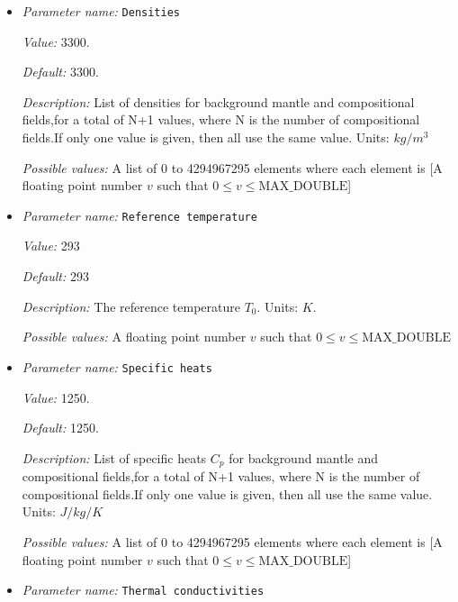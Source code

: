 \begin{itemize}
\item {\it Parameter name:} {\tt Densities}
\label{parameters:Material model/Dynamic Friction/Densities}
\label{parameters:Material_20model/Dynamic_20Friction/Densities}


{\it Value:} 3300.


{\it Default:} 3300.


{\it Description:} List of densities for background mantle and compositional fields,for a total of N+1 values, where N is the number of compositional fields.If only one value is given, then all use the same value.  Units: $kg / m^3$


{\it Possible values:} A list of 0 to 4294967295 elements where each element is [A floating point number $v$ such that $0 \leq v \leq \text{MAX\_DOUBLE}$]
\item {\it Parameter name:} {\tt Reference temperature}
\label{parameters:Material model/Dynamic Friction/Reference temperature}
\label{parameters:Material_20model/Dynamic_20Friction/Reference_20temperature}


{\it Value:} 293


{\it Default:} 293


{\it Description:} The reference temperature $T_0$. Units: $K$.


{\it Possible values:} A floating point number $v$ such that $0 \leq v \leq \text{MAX\_DOUBLE}$
\item {\it Parameter name:} {\tt Specific heats}
\label{parameters:Material model/Dynamic Friction/Specific heats}
\label{parameters:Material_20model/Dynamic_20Friction/Specific_20heats}


{\it Value:} 1250.


{\it Default:} 1250.


{\it Description:} List of specific heats $C_p$ for background mantle and compositional fields,for a total of N+1 values, where N is the number of compositional fields.If only one value is given, then all use the same value. Units: $J /kg /K$


{\it Possible values:} A list of 0 to 4294967295 elements where each element is [A floating point number $v$ such that $0 \leq v \leq \text{MAX\_DOUBLE}$]
\item {\it Parameter name:} {\tt Thermal conductivities}
\label{parameters:Material model/Dynamic Friction/Thermal conductivities}
\label{parameters:Material_20model/Dynamic_20Friction/Thermal_20conductivities}



\end{itemize}
